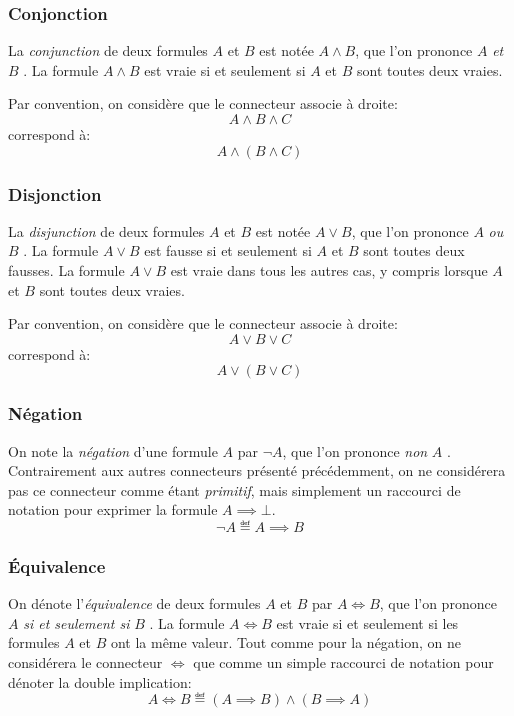 \subsubsection{Conjonction}

La \textit{conjunction} de deux formules $A$ et $B$ est notée $A \wedge B$, que l'on prononce \og $A$ \textit{et} $B$ \fg{}.
La formule $A \wedge B$ est vraie si et seulement si $A$ et $B$ sont toutes deux vraies.

Par convention, on considère que le connecteur associe à droite:
\[
A \wedge B \wedge C
\]
correspond à:
\[
A \wedge (B \wedge C)
\]


\subsubsection{Disjonction}

La \textit{disjunction} de deux formules $A$ et $B$ est notée $A \vee B$, que l'on prononce \og $A$ \textit{ou} $B$ \fg{}.
La formule $A \vee B$ est fausse si et seulement si $A$ et $B$ sont toutes deux fausses.
La formule $A \vee B$ est vraie dans tous les autres cas, y compris lorsque $A$ et $B$ sont toutes deux vraies.

Par convention, on considère que le connecteur associe à droite:
\[
A \vee B \vee C
\]
correspond à:
\[
A \vee (B \vee C)
\]

\subsubsection{Négation}

On note la \textit{négation} d'une formule $A$ par $\neg A$, que l'on prononce \og \textit{non} $A$ \fg{}. Contrairement aux autres connecteurs présenté précédemment, on ne considérera pas ce connecteur comme étant \textit{primitif}, mais simplement un raccourci de notation pour exprimer la formule $A \implies \bot$.
\[
\neg A \eqdef A \implies B
\]

\subsubsection{Équivalence}

On dénote l'\textit{équivalence} de deux formules $A$ et $B$ par $A \iff B$, que l'on prononce \og $A$ \textit{si et seulement si} $B$ \fg{}. La formule $A \iff B$ est vraie si et seulement si les formules $A$ et $B$ ont la même valeur. Tout comme pour la négation, on ne considérera le connecteur ${\iff}$ que comme un simple raccourci de notation pour dénoter la double implication:
\[
A \iff B \eqdef (A \implies B) \wedge (B \implies A)
\]

